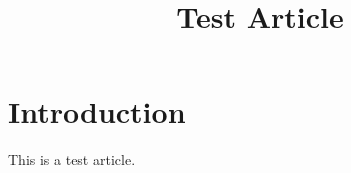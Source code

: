 \documentclass{ccr}
\title{Test Article}
\begin{document}
\maketitle

\section{Introduction}
This is a test article.

\printbibliography
\end{document}
